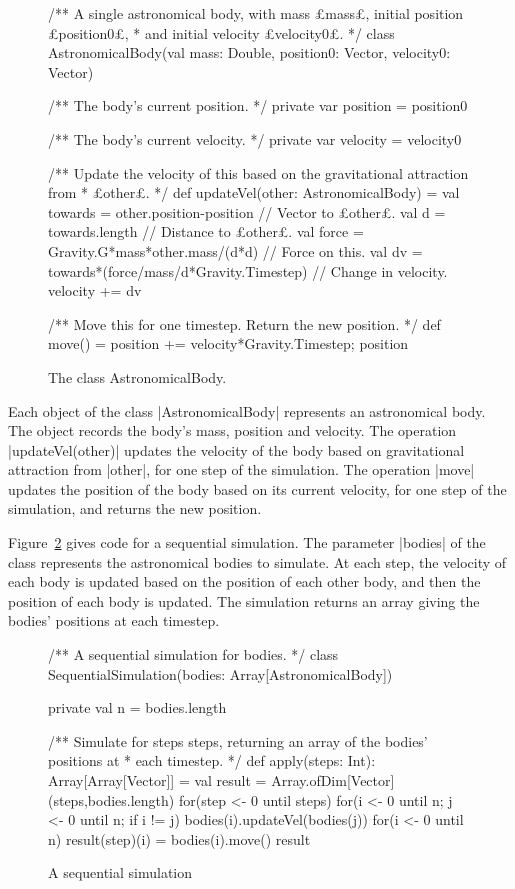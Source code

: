 \begin{figure}
\begin{scala}
/** A single astronomical body, with mass £mass£, initial position £position0£,
  * and initial velocity £velocity0£. */
class AstronomicalBody(val mass: Double, position0: Vector, velocity0: Vector){
  /** The body's current position. */
  private var position = position0

  /** The body's current velocity. */
  private var velocity = velocity0

  /** Update the velocity of this based on the gravitational attraction from
    * £other£. */
  def updateVel(other: AstronomicalBody) = {
    val towards = other.position-position // Vector to £other£.
    val d = towards.length // Distance to £other£.
    val force = Gravity.G*mass*other.mass/(d*d) // Force on this.
    val dv = towards*(force/mass/d*Gravity.Timestep) // Change in velocity.
    velocity += dv
  }

  /** Move this for one timestep.  Return the new position. */
  def move() = { position += velocity*Gravity.Timestep; position }
}
\end{scala}
\caption{The class {\scalashape
    AstronomicalBody}.} 
\label{fig:AstronomicalBody}
\end{figure}


Each object of the class |AstronomicalBody| represents an astronomical body.
The object records the body's mass, position and velocity.  The operation
|updateVel(other)| updates the velocity of the body based on gravitational
attraction from |other|, for one step of the simulation.  The operation |move|
updates the position of the body based on its current velocity, for one step
of the simulation, and returns the new position.

Figure~\ref{fig:SequentialSimulation} gives code for a sequential simulation.
The parameter |bodies| of the class represents the astronomical bodies to
simulate.  At each step, the velocity of each body is updated based on the
position of each other body, and then the position of each body is updated.
The simulation returns an array giving the bodies' positions at each
timestep. 


\begin{figure}
\begin{scala}
/** A sequential simulation for bodies. */
class SequentialSimulation(bodies: Array[AstronomicalBody]){
  private val n = bodies.length

  /** Simulate for steps steps, returning an array of the bodies' positions at
    * each timestep. */
  def apply(steps: Int): Array[Array[Vector]] = {
    val result = Array.ofDim[Vector](steps,bodies.length)
    for(step <- 0 until steps){
      for(i <- 0 until n; j <- 0 until n; if i != j) 
        bodies(i).updateVel(bodies(j))
      for(i <- 0 until n) result(step)(i) = bodies(i).move()
    }
    result
  }
}
\end{scala}
\caption{A sequential simulation}
\label{fig:SequentialSimulation}
\end{figure}

